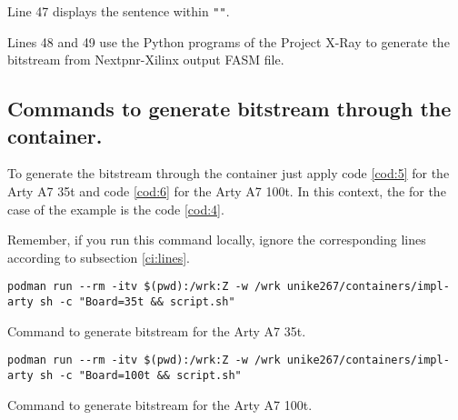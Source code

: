 \vspace{5mm} 

\noindent Line 47 displays the sentence within \texttt{""}.

\vspace{5mm} 

\noindent Lines 48 and 49 use the Python programs of the Project X-Ray to generate the bitstream from Nextpnr-Xilinx output FASM file.

\subsection{Commands to generate bitstream through the container.}

To generate the bitstream through the container just apply code \ref{cod:5} for the Arty A7 35t and code \ref{cod:6} for the Arty A7 100t. 
In this context, the  for the case of the example is the code \ref{cod:4}.

\vspace{5mm} 

\noindent Remember, if you run this command locally, ignore the corresponding lines according to subsection \ref{ci:lines}.

\begin{code}
\begin{verbatim}
podman run --rm -itv $(pwd):/wrk:Z -w /wrk unike267/containers/impl-arty sh -c "Board=35t && script.sh"
\end{verbatim}
\caption{Command to generate bitstream for the Arty A7 35t.}
\label{cod:5}
\end{code}

\begin{code}
\begin{verbatim}
podman run --rm -itv $(pwd):/wrk:Z -w /wrk unike267/containers/impl-arty sh -c "Board=100t && script.sh"
\end{verbatim}
\caption{Command to generate bitstream for the Arty A7 100t.}
\label{cod:6}
\end{code}

\vspace{15mm} 

